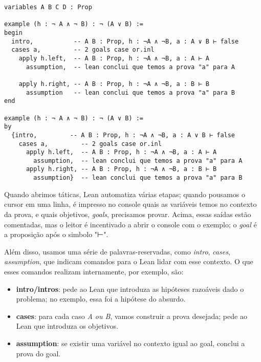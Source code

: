 \vspace{5mm}
\begin{lstlisting}
variables A B C D : Prop

example (h : ¬ A ∧ ¬ B) : ¬ (A ∨ B) :=
begin
  intro,           -- A B : Prop, h : ¬A ∧ ¬B, a : A ∨ B ⊢ false
  cases a,         -- 2 goals case or.inl
    apply h.left,  -- A B : Prop, h : ¬A ∧ ¬B, a : A ⊢ A
      assumption,  -- lean conclui que temos a prova "a" para A

    apply h.right, -- A B : Prop, h : ¬A ∧ ¬B, a : B ⊢ B
      assumption   -- lean conclui que temos a prova "a" para B
end

example (h : ¬ A ∧ ¬ B) : ¬ (A ∨ B) :=
by 
  {intro,         -- A B : Prop, h : ¬A ∧ ¬B, a : A ∨ B ⊢ false
    cases a,         -- 2 goals case or.inl
	  apply h.left,  -- A B : Prop, h : ¬A ∧ ¬B, a : A ⊢ A
        assumption,  -- lean conclui que temos a prova "a" para A
      apply h.right, -- A B : Prop, h : ¬A ∧ ¬B, a : B ⊢ B
        assumption}  -- lean conclui que temos a prova "a" para B 

\end{lstlisting}
\vspace{5mm}

Quando abrimos táticas, Lean automatiza várias etapas; quando pousamos o cursor em uma linha, é impresso no console quais as variáveis temos no contexto da prova, e quais objetivos, \textit{goals}, precisamos provar. Acima, essas saídas estão comentadas, mas o leitor é incentivado a abrir o console com o exemplo; o \textit{goal} é a proposição após o simbolo "⊢".

Além disso, usamos uma série de palavras-reservadas, como \textit{intro}, \textit{cases}, \textit{assumption}, que indicam comandos para o Lean lidar com esse contexto. O que esses comandos realizam internamente, por exemplo, são:

\begin{itemize}
    \item \textbf{intro/intros}: pede ao Lean que introduza as hipóteses razoáveis dado o problema; no exemplo, essa foi a hipótese do absurdo.
    \item \textbf{cases}: para cada caso \textit{A ou B}, vamos construir a prova desejada; pede ao Lean que introduza os objetivos.
    \item \textbf{assumption}: se existir uma variável no contexto igual ao goal, conclui a prova do goal.
\end{itemize}

